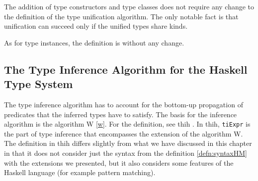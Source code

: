 The addition of type constructors and type classes does not require any change to the definition of the type unification algorithm. The only notable fact is that unification can succeed only if the unified types share kinds.

As for type instances, the definition is without any change.

\subsection{The Type Inference Algorithm for the Haskell Type System}

The type inference algorithm has to account for the bottom-up propagation of predicates that the inferred types have to satisfy. The basis for the inference algorithm is the algorithm W \ref{w}. For the definition, see thih \cite{jones1999typing}. In thih, \lstinline[language=haskell]{tiExpr} is the part of type inference that encompasses the extension of the algorithm W. The definition in thih differs slightly from what we have discussed in this chapter in that it does not consider just the syntax from the definition \ref{defn:syntaxHM} with the extensions we presented, but it also considers some features of the Haskell language (for example pattern matching).
